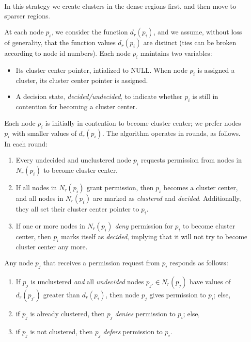 In this strategy we create clusters in the dense regions first, and then move to sparser regions. 

 At each node $p_i$, we consider the function $d_{r}(p_{i})$, and we assume, without loss of generality, that the function values $d_r(p_i)$ are distinct (ties can be broken according to node id numbers).
Each node $p_i$ maintains two variables:
\begin{itemize}
\item Its cluster center pointer, intialized to NULL. When node $p_i$ is assigned a cluster, its cluster center pointer is assigned. 
\item A decision state, {\em decided/undecided}, to indicate whether $p_i$ is still in contention for becoming a cluster center.
\end{itemize}
Each node $p_i$ is initially in contention to become cluster center; we prefer nodes $p_i$ with smaller values of $d_{r}(p_i)$. The algorithm operates in rounds, as follows. In each round:

\begin{enumerate}
\item Every undecided and unclustered node $p_i$ requests permission from nodes in $N_{r}(p_{i})$ to become cluster center.
\item If all nodes in $N_{r}(p_{i})$ grant permission, then $p_i$ becomes a cluster center, and all nodes in $N_{r}(p_{i})$ are marked as {\em clustered} and {\em decided}. Additionally, they all set their cluster center pointer to $p_i$. 
\item If one or more nodes in $N_{r}(p_{i})$ {\em deny} permission for $p_i$ to become cluster center, then $p_i$ marks itself as {\em decided}, implying that it will not try to become cluster center any more.
\end{enumerate}

Any node $p_j$ that receives a permission request from $p_i$ responds as follows:
\begin{enumerate}
\item  If $p_j$ is unclustered {\em and} all {\em undecided} nodes $p_{j'}\in N_{r}(p_{j})$ have values of $d_{r}(p_{j'})$ greater than $d_r(p_i)$, then node $p_j$ gives permission to $p_i$; else, 
\item if $p_j$ is already clustered, then $p_j$ {\em denies} permission to $p_i$; else, 
\item if $p_j$ is not clustered, then $p_j$ {\em defers} permission to $p_i$.
\end{enumerate}

